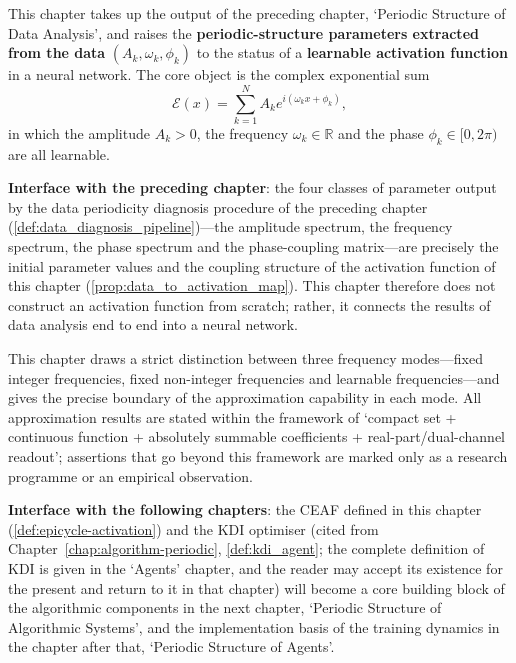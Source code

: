 \begin{remark}\label{rem:epicycle-activation-positioning}
This chapter takes up the output of the preceding chapter, `Periodic Structure of Data Analysis', and raises the \textbf{periodic-structure parameters extracted from the data} $(A_k,\omega_k,\phi_k)$ to the status of a \textbf{learnable activation function} in a neural network. The core object is the complex exponential sum
\[
\mathcal E(x)=\sum_{k=1}^{N}A_k e^{i(\omega_k x+\phi_k)},
\]
in which the amplitude $A_k>0$, the frequency $\omega_k\in\mathbb R$ and the phase $\phi_k\in[0,2\pi)$ are all learnable.

\textbf{Interface with the preceding chapter}: the four classes of parameter output by the data periodicity diagnosis procedure of the preceding chapter (\cref{def:data_diagnosis_pipeline})---the amplitude spectrum, the frequency spectrum, the phase spectrum and the phase-coupling matrix---are precisely the initial parameter values and the coupling structure of the activation function of this chapter (\cref{prop:data_to_activation_map}). This chapter therefore does not construct an activation function from scratch; rather, it connects the results of data analysis end to end into a neural network.

This chapter draws a strict distinction between three frequency modes---fixed integer frequencies, fixed non-integer frequencies and learnable frequencies---and gives the precise boundary of the approximation capability in each mode. All approximation results are stated within the framework of `compact set + continuous function + absolutely summable coefficients + real-part/dual-channel readout'; assertions that go beyond this framework are marked only as a research programme or an empirical observation.

\textbf{Interface with the following chapters}: the CEAF defined in this chapter (\cref{def:epicycle-activation}) and the KDI optimiser (cited from Chapter~\ref{chap:algorithm-periodic}, \cref{def:kdi_agent}; the complete definition of KDI is given in the `Agents' chapter, and the reader may accept its existence for the present and return to it in that chapter) will become a core building block of the algorithmic components in the next chapter, `Periodic Structure of Algorithmic Systems', and the implementation basis of the training dynamics in the chapter after that, `Periodic Structure of Agents'.


\end{remark}
